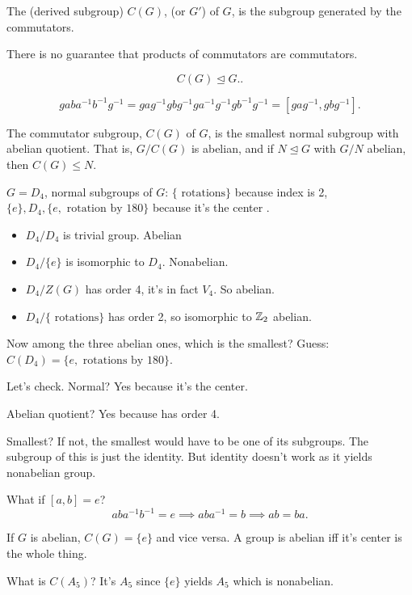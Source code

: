 \documentclass[class=article,crop=false]{standalone}
\begin{document}
\begin{defn}
	The  (derived subgroup) $ C(G)$, (or $ G'$) of $ G$, is the subgroup generated by the commutators. 
\end{defn}
\begin{note}[]
There is no guarantee that products of commutators are commutators.
\end{note}
\begin{thm}[]
\[
	C(G) \trianglelefteq G.
.\] 
\end{thm}

\begin{prf}
\[
	gaba^{-1}b^{-1}g^{-1} = gag^{-1}gbg^{-1}ga^{-1}g^{-1}gb^{-1}g^{-1} = [gag^{-1},gbg^{-1}]
.\] 
\end{prf}
\begin{thm}[IMPORTANT]
	The commutator subgroup, $ C(G)$ of  $ G$, is the smallest normal subgroup with abelian quotient. That is, $ G /C(G)$ is abelian, and if  $ N \trianglelefteq G $ with $ G /N$ abelian, then  $ C(G) \leq N$.
\end{thm}
\begin{eg}[]
$ G=D_4$, normal subgroups of $ G$:  $ \{ \text{ rotations} \} $ because index is 2, $ \{e\}, D_4, \{e, \text{ rotation by 180} \}$ because it's the center .

\begin{itemize}
	\item $ D_4 /D_4$ is trivial group. Abelian
	\item $ D_4 / \{e\} $ is isomorphic to $ D_4$. Nonabelian.
	\item $ D_4 / Z(G)$ has order 4, it's in fact $ V_4$. So abelian.
	\item $ D_4 / \{ \text{ rotations} \} $ has order 2, so isomorphic to $ \mathbb{Z}_2$ abelian.
\end{itemize}
Now among the three abelian ones, which is the smallest? Guess: $ C(D_4) = \{e, \text{ rotations by 180} \} $. 

Let's check. Normal? Yes because it's the center.

Abelian quotient? Yes because has order 4.

Smallest? If not, the smallest would have to be one of its subgroups. The subgroup of this is just the identity. But identity doesn't work as it yields nonabelian group.
\end{eg}
\begin{intuition}
	What if $ [a,b]=e$?
	\[
		aba^{-1}b^{-1} = e \implies aba^{-1}=b \implies ab=ba
	.\] 
\end{intuition}
\begin{note}[]
	If $ G$ is abelian,  $ C(G) = \{e\} $ and vice versa. A group is abelian iff it's center is the whole thing.
\end{note}

\begin{eg}[]
	What is $ C(A_5)$? It's $ A_5$ since $ \{e\} $ yields $ A_5$ which is nonabelian.
\end{eg}
\end{document}
